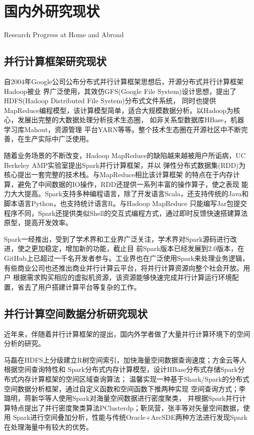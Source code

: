 \section{国内外研究现状}{Research Progress at Home and Abroad}
\subsection{并行计算框架研究现状}
自$2004$年Google公司公布分布式并行计算框架思想后\cite{Dean2004MapReduce}，开源分布式并行计算框架Hadoop被业
界广泛使用，其效仿GFS(Google File System)设计思想，提出了HDFS(Hadoop Distributed File System)分布式文件系统，
同时也提供MapReduce编程模型，该计算模型简单，适合大规模数据分析。以Hadoop为核心，发展出完整的大数据处理分析技术生态圈，
如非关系型数据库HBase\cite{Lars2011HBase}，机器学习库Mahout\cite{Lyubimov2016Apache}，资源管理
平台YARN\cite{Vavilapalli2013Apache}等等。整个技术生态圈在开源社区中不断完善，在生产实际中广泛使用。

随着业务场景的不断改变，Hadoop MapReduce的缺陷越来越被用户所诟病，UC Berkeley AMP实验室提出Spark并行计算框架，并以
弹性分布式数据集(RDD)为核心提出一套完整的技术栈。与MapReduce相比该计算框架
的特点在于内存计算，避免了中间数据的IO操作，RDD还提供一系列丰富的操作算子\cite{Zaharia2010Spark}，使之表现
能力大大提高。Spark支持多种编程语言，除了开发语言Scala，还支持传统的Java和脚本语言Python，也支持统计语言R。与Hadoop MapReduce
只能编写Jar包提交程序不同，Spark还提供类似Shell的交互式编程方式，通过即时反馈快速搭建算法原型，提高开发效率。

Spark一经推出，受到了学术界和工业界广泛关注，学术界对Spark源码进行改进，使之更加稳定，增加新的功能，截止目
前Spark版本已经发展到$2.0$版本，在GitHub上已超过一千名开发者参与。工业界也在广泛使用Spark来处理业务逻辑，
有些商业公司也还推出商业并行计算云平台\cite{2015Aliyun, Varia2011Best}，将并行计算资源向整个社会开放。用户
根据需求购买相应的虚拟机资源，该资源能够快速完成并行计算运行环境配置，省去了用户搭建计算平台等复杂的工作。

\subsection{并行计算空间数据分析研究现状}   
近年来，伴随着并行计算框架的提出，国内外学者做了大量并行计算环境下的空间分析的研究。

马磊在HDFS上分级建立R树空间索引\cite{马磊2016一种基于}，加快海量空间数据查询速度；方金云等人根据空间查询特性和
Spark分布式内存计算模型\cite{方金云2015基于}，设计HBase分布式存储Spark分布式内存计算框架的空间区域查询算法；
温馨实现一种基于Shark/Spark的分布式空间数据分析框架\cite{温馨2015基于}，通过自定义函数和空间函数下推两种实现
空间查询方式；李璐明，蒋新华等人使用Spark对海量空间数据进行密度聚类\cite{李璐明2015基于弹性分布数据集的海量空间数据密度聚类}，
并根据Spark并行计算特点提出了并行密度聚类算法PClusterdp；靳凤营，张丰等对矢量空间数据，使用
Spark进行空间叠加分析，性能与传统Oracle+ArcSDE两种方法进行发现Spark在处理海量中有较大的优势\cite{靳凤营2016基于}。


